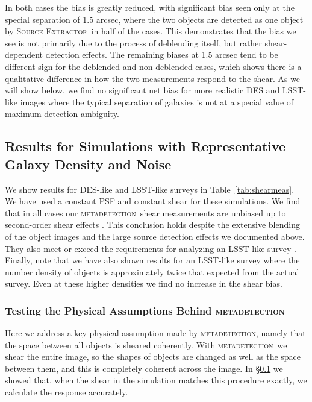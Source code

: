 \documentclass[iop, appendixfloats, numberedappendix, apj]{emulateapj}
\newcommand{\mdet}{\textsc{metadetection}}
\newcommand{\sx}{\textsc{Source Extractor}}
\begin{document}
In both cases the bias is greatly reduced, with significant bias seen only at
the special separation of 1.5 arcsec, where the two objects are detected as one
object by \sx\ in half of the cases. This demonstrates that the bias we see is
not primarily due to the process of deblending itself, but rather
shear-dependent detection effects. The remaining biases at 1.5 arcsec tend to
be different sign for the deblended and non-deblended cases, which shows there
is a qualitative difference in how the two measurements respond to the shear.
As we will show below, we find no significant net bias for more realistic DES
and LSST-like images where the typical separation of galaxies is not at a
special value of maximum detection ambiguity.

\subsection{Results for Simulations with Representative Galaxy Density and Noise}
\label{sec:res:constpsf}

We show results for DES-like and LSST-like surveys in Table~\ref{tab:shearmeas}.
We have used a constant PSF and constant shear for these simulations. We find
that in all cases our \mdet\ shear measurements are unbiased up to
second-order shear effects \citep[we expect a bias of a few parts in 10000 for shears
of 0.02, see][]{SheldonMcal2017}. This conclusion holds despite the extensive blending
of the object images and the large source detection effects we documented
above. They also meet or exceed the requirements for analyzing an LSST-like survey
\citep[e.g.,][]{huterer2006}. Finally, note that we have also shown results for an
LSST-like survey where the number density of objects is approximately twice that
expected from the actual survey.  Even at these higher densities we find
no increase in the shear bias.

\subsubsection{Testing the Physical Assumptions Behind \mdet}
\label{sec:mdetphys}

Here we address a key physical assumption made by \mdet, namely that the space
between all objects is sheared coherently.   With \mdet\ we shear the entire
image, so the shapes of objects are changed as well as the space between them,
and this is completely coherent across the image.  In \S \ref{sec:res:constpsf}
we showed that, when the shear in the simulation matches this procedure
exactly, we calculate the response accurately.
\end{document}
